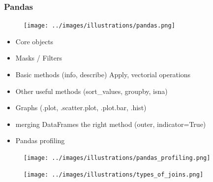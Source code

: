 \begin{frame}\frametitle{Pandas}
   \begin{figure}[H]
      \hspace{4cm}
      \texttt{[image: ../images/illustrations/pandas.png]}
   \end{figure}
   \vspace{-1.2cm}
   \begin{itemize}
      \item Core objects
      \item Masks / Filters
      \item Basic methods (info, describe) Apply, vectorial operations
      \item Other useful methods (sort\_values, groupby, isna)
      \item Graphs (.plot, .scatter.plot, .plot.bar, .hist)
      \item merging DataFrames the right method (outer, indicator=True)
      \item Pandas profiling
   \end{itemize}

   \hspace{.5cm}
   \begin{minipage}{0.38\linewidth}
      \begin{figure}[H]
         \texttt{[image: ../images/illustrations/pandas\_profiling.png]}
      \end{figure}
   \end{minipage}
   \begin{minipage}{0.48\linewidth}
      \vspace{-.8cm}
      \begin{figure}[H]
         \texttt{[image: ../images/illustrations/types\_of\_joins.png]}
      \end{figure}
   \end{minipage}
\end{frame}


